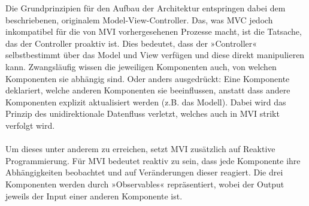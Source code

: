 Die Grundprinzipien für den Aufbau der Architektur entspringen dabei dem beschriebenen, originalem Model-View-Controller. Das, was MVC jedoch inkompatibel für die von MVI vorhergesehenen Prozesse macht, ist die Tatsache, das der Controller proaktiv ist. Dies bedeutet, dass der »Controller« selbstbestimmt über das Model und View verfügen und diese direkt manipulieren kann. Zwangsläufig wissen die jeweiligen Komponenten auch, von welchen Komponenten sie abhängig sind. Oder anders ausgedrückt: Eine Komponente deklariert, welche anderen Komponenten sie beeinflussen, anstatt dass andere Komponenten explizit aktualisiert werden (z.B. das Modell). Dabei wird das Prinzip des unidirektionale Datenfluss verletzt, welches auch in MVI strikt verfolgt wird. 
\\
\\
Um dieses unter anderem zu erreichen, setzt MVI zusätzlich auf Reaktive Programmierung. Für MVI bedeutet reaktiv zu sein, dass jede Komponente ihre Abhängigkeiten beobachtet und auf Veränderungen dieser reagiert. Die drei Komponenten werden durch »Observables« repräsentiert, wobei der Output jeweils der Input einer anderen Komponente ist.

